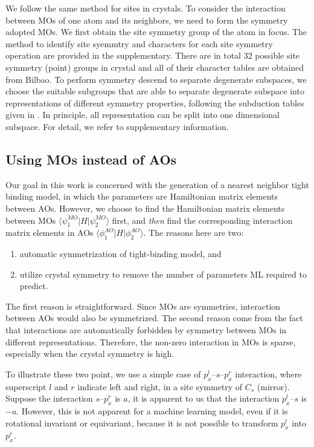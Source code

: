 \documentclass{article}
\begin{document}
We follow the same method for sites in crystals. To consider the interaction between MOs of one atom and its neighbors, 
we need to form the symmetry adopted MOs. We first obtain the site symmetry group of the atom in focus. The 
method to identify site syemmtry and characters for each site symmetry operation are provided in the supplementary. 
There are in total 32 possible site symmetry (point) groups in crystal and all of their character tables are obtained from Bilbao. 
To perform symmetry descend to separate degenerate subspaces, we choose the suitable subgroups that are able to separate degenerate 
subspace into representations of different symmetry properties, following the subduction tables 
given in \cite{altmann_point-group_1994}. In principle, all representation can be split into one dimensional subspace. 
For detail, we refer to supplementary information.

\subsection{Using MOs instead of AOs}
Our goal in this work is concerned with the generation of a nearest neighbor tight binding model, in which 
the parameters are Hamiltonian matrix elements between AOs. However, we choose to find 
the Hamiltonian matrix elements between MOs $\langle \psi^{MO}_1 | H | \psi^{MO}_2 \rangle$ first, and \emph{then} find the corresponding 
interaction matrix elements in AOs $\langle \phi^{AO}_1 | H | \phi^{AO}_2 \rangle$. The reasons here are two:
\begin{enumerate}
    \item automatic symmetrization of tight-binding model, and 
    \item utilize crystal symmetry to remove the number of parameters ML required to predict.
\end{enumerate}
The first reason is straightforward. Since MOs are symmetries, interaction between AOs would also be symmetrized. The second reason come 
from the fact that interactions are automatically forbidden by symmetry between MOs in different representations. Therefore, the non-zero interaction 
in MOs is sparse, especially when the crystal symmetry is high. 

To illustrate these two point, we use a simple case of $p_x^l$--$s$--$p_x^r$ interaction, where superscript $l$ and $r$ indicate left and right, in 
a site symmetry of $C_s$ (mirror). Suppose the interaction $s$--$p_x^r$ is $a$, it is apparent to us that the interaction $p_x^l$--$s$ is $-a$. However,
this is not apparent for a machine learning model, even if it is rotational invariant or equivariant, because it is not possible to transform $p_x^l$
into $p_x^r$. 
\end{document}

